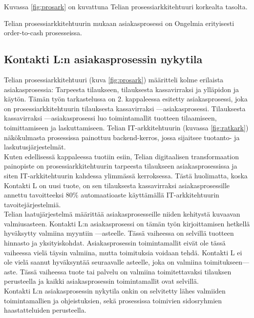 \documentclass[finnish,12pt,a4paper,pdftex]{article}
\begin{document}
Kuvassa \ref{fig:prosark} on kuvattuna Telian prosessiarkkitehtuuri korkealta tasolta. 


Telian prosessiarkkitehtuurin mukaan asiakasprosessi on 
Ongelmia erityisesti order-to-cash prosesseissa.

\subsection{Kontakti L:n asiakasprosessin nykytila}

Telian prosessiarkkitehtuuri (kuva \ref{fig:prosark}) määritteli kolme erilaista asiakasprosessia: Tarpeesta tilaukseen, tilauksesta kassavirraksi ja ylläpidon ja käytön. Tämän työn tarkastelussa on 2. kappaleessa esitetty asiakasprosessi, joka on prosessiarkkitehtuurin tilauksesta kassavirraksi —asiakasprosessi. Tilauksesta kassavirraksi —asiakasprosessi luo toimintamallit tuotteen tilaamiseen, toimittamiseen ja laskuttamiseen. Telian IT-arkkitehtuurin (kuvassa \ref{fig:ratkark}) näkökulmasta prosessissa painottuu backend-kerros, jossa sijaitsee tuotanto- ja laskutusjärjestelmät.\\

Kuten edellisessä kappaleessa tuotiin esiin, Telian digitaalisen transformaation painopiste on prosessiarkkitehtuurin tarpeesta tilaukseen asiakasprosessissa ja siten IT-arkkitehtuurin kahdessa ylimmässä kerroksessa. Tästä huolimatta, koska Kontakti L on uusi tuote, on sen tilauksesta kassavirraksi asiakasprosessille annettu tavoitteeksi 80\% automaatioaste käyttämällä IT-arkkitehtuurin tavoitejärjestelmiä.\\

Telian laatujärjestelmä määrittää asiakasprosesseille niiden kehitystä kuvaavan valmiusasteen. Kontakti L:n asiakasprosessi on tämän työn kirjoittamisen hetkellä hyväksytty valmiina myyntiin —asteelle. Tässä vaiheessa on selvillä tuotteen hinnasto ja yksityiskohdat. Asiakasprosessin toimintamallit eivät ole tässä vaiheessa vielä täysin valmiina, mutta toimituksia voidaan tehdä. Kontakti L ei ole vielä saanut hyväksyntää seuraavalle asteelle, joka on valmiina toimitukseen—aste. Tässä vaiheessa tuote tai palvelu on valmiina toimitettavaksi tilauksen perusteella ja kaikki asiakasprosessin toimintamallit ovat selvillä.\\

Kontakti L:n asiakasprosessin nykytila onkin on selvitetty lähes valmiiden toimintamallien ja ohjeistuksien, sekä prosessissa toimivien sidosryhmien haastatteluiden perusteella.
\end{document}
